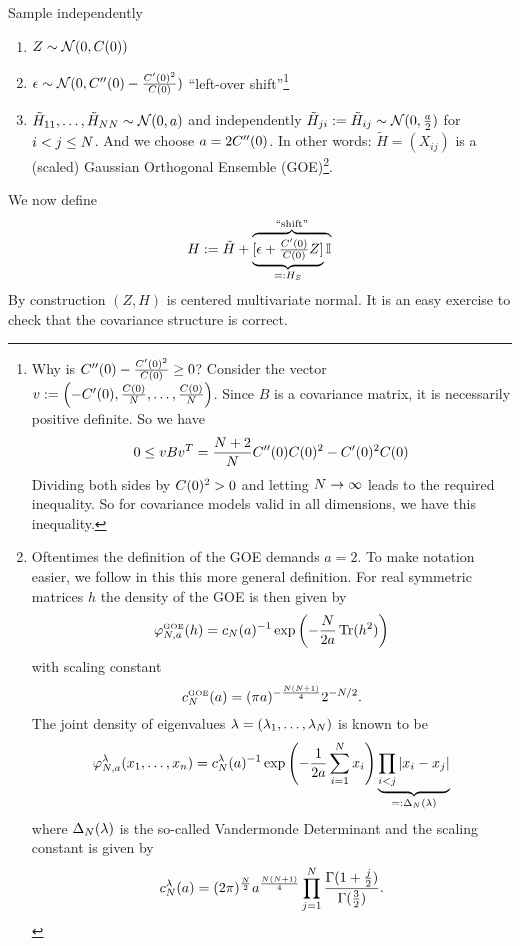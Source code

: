Sample independently
\begin{enumerate}
	\item \(Z\sim\mathcal{N}(0, C(0))\)
	\item \(\epsilon \sim \mathcal{N}(0, C''(0) - \frac{C'(0)^2}{C(0)})\)
	``left-over shift''\footnote{
		Why is \(C''(0) - \frac{C'(0)^2}{C(0)} \ge 0\)? Consider the
		vector \(v:=\left(-C'(0), \frac{C(0)}{N}, \dots,
		\frac{C(0)}{N}\right)\).  Since \(B\) is a covariance matrix, it
		is necessarily positive definite.
		So we have
		\[
			0 \le v B v^T
			= \frac{N+2}{N}C''(0)C(0)^2 - C'(0)^2C(0)
		\]
		Dividing both sides by \(C(0)^2 > 0\) and letting \(N\to\infty\)
		leads to the required inequality. So for covariance models valid in all
		dimensions, we have this inequality.
	}
	\item \(\tilde{H}_{11},\dots,\tilde{H}_{NN}\sim\mathcal{N}(0,
	a)\) and independently
	\(\tilde{H}_{ji}:=\tilde{H}_{ij}\sim\mathcal{N}(0,\frac{a}{2})\) for
	\(i<j\le N\). And we choose \(a=2C''(0)\).
	In other words: \(\tilde{H} = (X_{ij})\) is a (scaled) Gaussian Orthogonal
	Ensemble (GOE)\footnote{
		Oftentimes the definition of the GOE demands \(a=2\). To make notation
		easier, we follow \textcite{fyodorovHighDimensionalRandomFields2013} in
		this this more general definition.
		For real symmetric matrices \(h\) the density of the GOE is then given by
		\[
			\varphi^{\text{\tiny GOE}}_{N,a}(h)
			= c_N(a)^{-1}\exp\left(-\frac{N}{2a}\operatorname{Tr}(h^2)\right)
		\]
		with scaling constant
		\[
			c^{\text{\tiny GOE}}_N(a)
			= (\pi a)^{-\frac{N(N+1)}{4}}2^{-N/2}.
		\]
		The joint density of eigenvalues
		\(\lambda=(\lambda_1,\dots,\lambda_N)\) is known to be
		\begin{equation}\label{eq: GOE ev density}
			\varphi^{\lambda}_{N, a}(x_1,\dots,x_n)
			= c^\lambda_N(a)^{-1}
			\exp\left(-\frac{1}{2a}\sum_{i=1}^N x_i\right)
			\underbrace{\prod_{i<j}|x_i - x_j|}_{=:\Delta_N(\lambda)}
		\end{equation}
		where \(\Delta_N(\lambda)\) is the so-called Vandermonde Determinant and
		the scaling constant is given by
		\[
			c^\lambda_N(a)
			= (2\pi)^{\frac{N}2}a^{\frac{N(N+1)}4}
			\prod_{j=1}^N \frac{\Gamma(1+\frac{j}2)}{\Gamma(\frac32)}.
		\]
	}.
\end{enumerate}
We now define
\[
	H := \tilde{H}
	+ \overbrace{\underbrace{[\epsilon + \tfrac{C'(0)}{C(0)} Z]}_{=:H_S}\mathbb{I}}^{\text{``shift''}}
\]
By construction \((Z,H)\) is centered multivariate normal. It is an easy
exercise to check that the covariance structure is correct.

